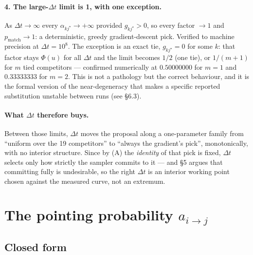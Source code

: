 \documentclass[11pt,a4paper]{article}
\newcommand{\dt}{\Delta t}
\newcommand{\pmatch}{p_{\mathrm{match}}}
\begin{document}
\paragraph{4. The large-$\dt$ limit is 1, with one exception.} As
$\dt\to\infty$ every $\alpha_{kj^{\star}} \to +\infty$ provided
$g_{kj^{\star}}>0$, so every factor $\to 1$ and $\pmatch \to 1$: a
deterministic, greedy gradient-descent pick. Verified to machine precision at
$\dt=10^{8}$. The exception is an exact tie, $g_{kj^{\star}}=0$ for some $k$:
that factor stays $\Phi(u)$ for all $\dt$ and the limit becomes $1/2$ (one
tie), or $1/(m+1)$ for $m$ tied competitors --- confirmed numerically at
$0.50000000$ for $m=1$ and $0.33333333$ for $m=2$. This is not a pathology but the correct behaviour, and
it is the formal version of the near-degeneracy that makes a specific reported
substitution unstable between runs (see  §6.3).

\paragraph{What $\dt$ therefore buys.} Between those limits, $\dt$ moves the
proposal along a one-parameter family from ``uniform over the 19 competitors''
to ``always the gradient's pick'', monotonically, with no interior structure.
Since by (A) the \emph{identity} of that pick is fixed, $\dt$ selects only how
strictly the sampler commits to it --- and \S5 argues that committing fully is
undesirable, so the right $\dt$ is an interior working point chosen against
the measured curve, not an extremum.

\section{\texorpdfstring{The pointing probability $a_{i\to j}$}{The pointing probability a(i->j)}}
\label{sec:aij}

\subsection{Closed form}
\end{document}
